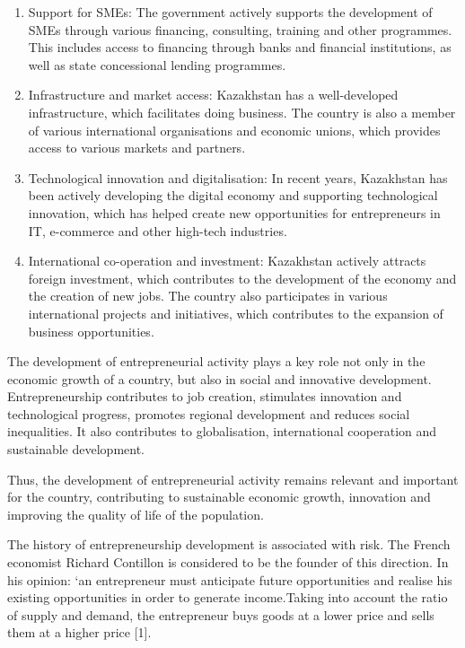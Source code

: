 \begin{enumerate}
\def\labelenumi{\arabic{enumi}.}
\setcounter{enumi}{1}
\item
  Support for SMEs: The government actively supports the development of
  SMEs through various financing, consulting, training and other
  programmes. This includes access to financing through banks and
  financial institutions, as well as state concessional lending
  programmes.
\item
  Infrastructure and market access: Kazakhstan has a well-developed
  infrastructure, which facilitates doing business. The country is also
  a member of various international organisations and economic unions,
  which provides access to various markets and partners.
\item
  Technological innovation and digitalisation: In recent years,
  Kazakhstan has been actively developing the digital economy and
  supporting technological innovation, which has helped create new
  opportunities for entrepreneurs in IT, e-commerce and other high-tech
  industries.
\item
  International co-operation and investment: Kazakhstan actively
  attracts foreign investment, which contributes to the development of
  the economy and the creation of new jobs. The country also
  participates in various international projects and initiatives, which
  contributes to the expansion of business opportunities.
\end{enumerate}

The development of entrepreneurial activity plays a key role not only in
the economic growth of a country, but also in social and innovative
development. Entrepreneurship contributes to job creation, stimulates
innovation and technological progress, promotes regional development and
reduces social inequalities. It also contributes to globalisation,
international cooperation and sustainable development.

Thus, the development of entrepreneurial activity remains relevant and
important for the country, contributing to sustainable economic growth,
innovation and improving the quality of life of the population.

The history of entrepreneurship development is associated with risk. The
French economist Richard Contillon is considered to be the founder of
this direction. In his opinion: `an entrepreneur must anticipate future
opportunities and realise his existing opportunities in order to
generate income.Taking into account the ratio of supply and demand, the
entrepreneur buys goods at a lower price and sells them at a higher
price {[}1{]}.

